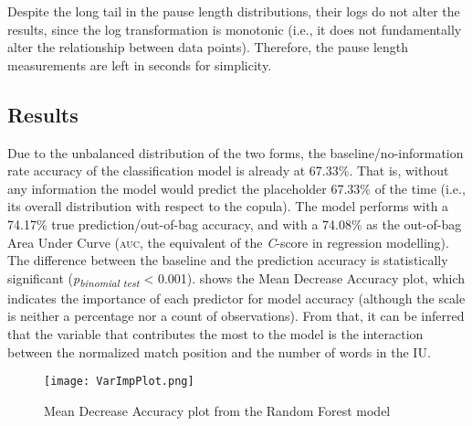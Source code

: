 \documentclass[output=paper,colorlinks,citecolor=brown
\ChapterDOI{10.5281/zenodo.15697581}
]{langscibook}
\begin{document}
Despite the long tail in the pause length distributions, their logs do not alter the results, since the log transformation is monotonic (i.e., it does not fundamentally alter the relationship between data points).
Therefore, the pause length measurements are left in seconds for simplicity. 


\subsection{Results} \label{sec_quant_results}
Due to the unbalanced distribution of the two forms, the baseline/no-information rate accuracy of the classification model is already at 67.33\%. 
That is, without any information the model would predict the placeholder 67.33\% of the time (i.e., its overall distribution with respect to the copula).
The model performs with a 74.17\% true prediction/out-of-bag accuracy, and with a 74.08\% as the out-of-bag Area Under Curve (\textsc{auc}, the equivalent of the \textit{C}-score in regression modelling).
The difference between the baseline and the prediction accuracy is statistically significant (\textit{p\textsubscript{binomial test}} < 0.001). 
 shows the Mean Decrease Accuracy plot, which indicates the importance of each predictor for model accuracy (although the scale is neither a percentage nor a count of observations).
From that, it can be inferred that the variable that contributes the most to the model is the interaction between the normalized match position and the number of words in the IU.

\begin{figure}
    \centering
    \texttt{[image: VarImpPlot.png]}
    \caption{Mean Decrease Accuracy plot from the Random Forest model}
    \label{fig:VarImpPlots}
\end{figure}
\end{document}
